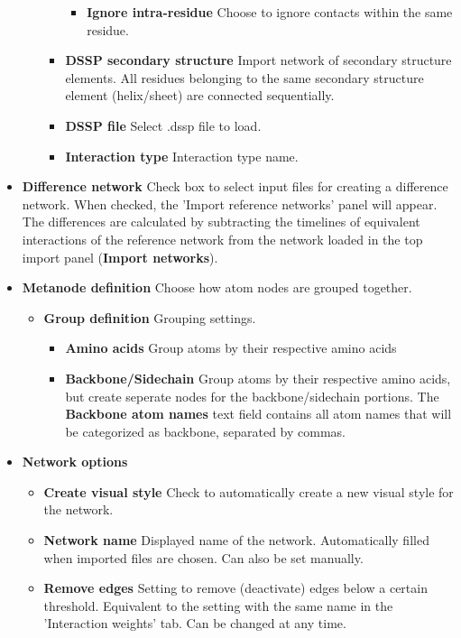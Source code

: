 \begin{itemize}
\begin{itemize}
\begin{itemize}
\begin{itemize}
    \item \textbf{Ignore intra-residue} Choose to ignore contacts within the same residue. 
    \end{itemize}
  \item \textbf{DSSP secondary structure} Import network of secondary structure elements. All residues belonging to the same secondary structure element (helix/sheet) are connected sequentially.
  \item \textbf{DSSP file} Select .dssp file to load.
  \item \textbf{Interaction type} Interaction type name.
  \end{itemize}
\end{itemize}

\item \textbf{Difference network} Check box to select input files for creating a difference network. When checked, the 'Import reference networks' panel will appear. The differences are calculated by subtracting the timelines of equivalent interactions of the reference network from the network loaded in the top import panel (\textbf{Import networks}).  

\item \textbf{Metanode definition} Choose how atom nodes are grouped together.
  \begin{itemize}
    \item \textbf{Group definition} Grouping settings.
  \begin{itemize}
  \item \textbf{Amino acids} Group atoms by their respective amino acids
  \item \textbf{Backbone/Sidechain} Group atoms by their respective amino acids, but create seperate nodes for the backbone/sidechain portions. The \textbf{Backbone atom names} text field contains all atom names that will be categorized as backbone, separated by commas.
  \end{itemize}
\end{itemize}

\item \textbf{Network options}
  \begin{itemize}
  \item \textbf{Create visual style} Check to automatically create a new visual style for the network.
  \item \textbf{Network name} Displayed name of the network. Automatically filled when imported files are chosen. Can also be set manually.
  \item \textbf{Remove edges} Setting to remove (deactivate) edges below a certain threshold. Equivalent to the setting with the same name in the 'Interaction weights' tab. Can be changed at any time.
  \end{itemize}
\end{itemize}
